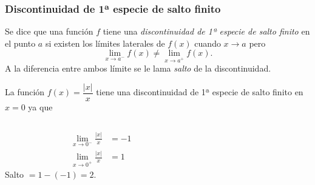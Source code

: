 	
	\begin{frame}
		\frametitle{Discontinuidad de 1ª especie de salto finito}
		\begin{definicion}
			Se dice que una función $f$ tiene una \emph{discontinuidad de 1ª especie de salto finito} en el punto $a$ si existen los límites laterales de $f(x)$ cuando $x\rightarrow a$ pero
			\[\lim_{x\rightarrow a^-}f(x)\neq \lim_{x\rightarrow a^+}f(x).\]
			A la diferencia entre ambos límite se le lama \emph{salto} de la discontinuidad.
		\end{definicion}
		
		 La función $f(x)=\dfrac{|x|}{x}$ tiene una discontinuidad de 1ª especie de salto finito en $x=0$ ya que
		\begin{columns}
			\begin{column}{0.4\textwidth}
				\begin{align*}
					\lim_{x\rightarrow 0^-}\frac{|x|}{x} & = -1 \\
					\lim_{x\rightarrow 0^+}\frac{|x|}{x} & = 1  
				\end{align*}
				Salto $= 1-(-1)=2$.
			\end{column}
			\begin{column}{0.5\textwidth}
				\begin{center}
					\scalebox{1}{}
				\end{center}
			\end{column}
		\end{columns}
	\end{frame}
	
